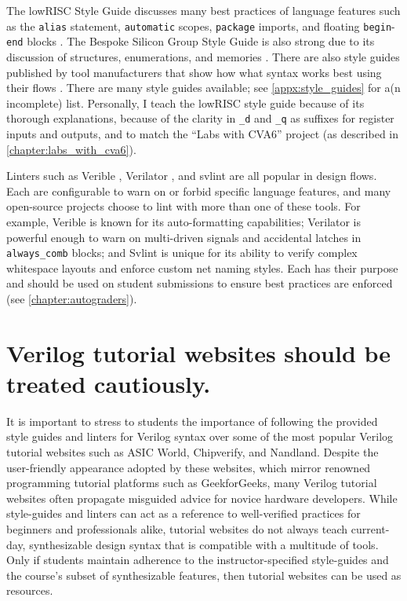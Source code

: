 The lowRISC Style Guide discusses many best practices of language features such as the \texttt{alias} statement, \texttt{automatic} scopes, \texttt{package} imports, and floating \texttt{begin}-\texttt{end} blocks \cite{lowRISCstyleguides}. The Bespoke Silicon Group Style Guide is also strong due to its discussion of structures, enumerations, and memories \cite{BSGstyleguide}. There are also style guides published by tool manufacturers that show how what syntax works best using their flows \cite{Xilinxstyleguide, Intelstyleguide, Latticestyleguide}. There are many style guides available; see \autoref{appx:style_guides} for a(n incomplete) list. Personally, I teach the lowRISC style guide because of its thorough explanations, because of the clarity in \texttt{_d} and \texttt{_q} as suffixes for register inputs and outputs, and to match the \enquote{Labs with CVA6} project (as described in \autoref{chapter:labs_with_cva6}).

Linters such as Verible \cite{veribleGitHub}, Verilator \cite{verilatorGitHub}, and svlint \cite{svlintGitHub} are all popular in design flows. Each are configurable to warn on or forbid specific language features, and many open-source projects choose to lint with more than one of these tools. For example, Verible is known for its auto-formatting capabilities; Verilator is powerful enough to warn on multi-driven signals and accidental latches in \texttt{always_comb} blocks; and Svlint is unique for its ability to verify complex whitespace layouts and enforce custom net naming styles. Each has their purpose and should be used on student submissions to ensure best practices are enforced (see \autoref{chapter:autograders}).

\section{Verilog tutorial websites should be treated cautiously.}
\label{section:tutorial_websites}

It is important to stress to students the importance of following the provided style guides and linters for Verilog syntax over some of the most popular Verilog tutorial websites such as ASIC World, Chipverify, and Nandland. Despite the user-friendly appearance adopted by these websites, which mirror renowned programming tutorial platforms such as GeekforGeeks, many Verilog tutorial websites often propagate misguided advice for novice hardware developers. While style-guides and linters can act as a reference to well-verified practices for beginners and professionals alike, tutorial websites do not always teach current-day, synthesizable design syntax that is compatible with a multitude of tools. Only if students maintain adherence to the instructor-specified style-guides and the course's subset of synthesizable features, then tutorial websites can be used as resources.

